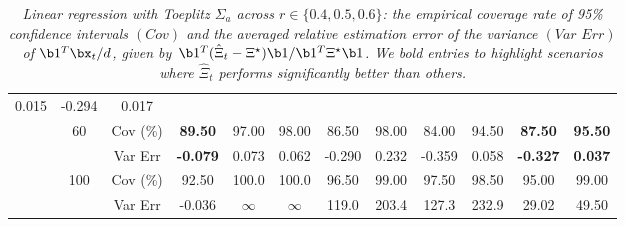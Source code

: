 \begin{table}[!t]
{\begin{tabular}{|c|c|c|c|cccccccc|}
\multicolumn{1}{c|}{0.015} &
-0.294 &
0.017 \\ \cline{2-12} 
&
\multirow{2}{*}{60} &
Cov (\%) &
\textbf{89.50} &
97.00 &
\multicolumn{1}{c|}{98.00} &
86.50 &
\multicolumn{1}{c|}{98.00} &
84.00 &
\multicolumn{1}{c|}{94.50} &
\textbf{87.50} &
\textbf{95.50} \\
&
&
Var Err &
\textbf{-0.079} &
0.073 &
\multicolumn{1}{c|}{0.062} &
-0.290 &
\multicolumn{1}{c|}{0.232} &
-0.359 &
\multicolumn{1}{c|}{0.058} &
\textbf{-0.327} &
\textbf{0.037} \\ \cline{2-12} 
&
\multirow{2}{*}{100} &
Cov (\%) &
92.50 &
100.0 &
\multicolumn{1}{c|}{100.0} &
96.50 &
\multicolumn{1}{c|}{99.00} &
97.50 &
\multicolumn{1}{c|}{98.50} &
95.00 &
99.00 \\
&
&
Var Err &
-0.036 &
$\infty$ &
\multicolumn{1}{c|}{$\infty$} &
119.0 &
\multicolumn{1}{c|}{203.4} &
127.3 &
\multicolumn{1}{c|}{232.9} &
29.02 &
49.50 \\ \hline		
\end{tabular}}
\caption{\textit{Linear regression with Toeplitz $\Sigma_a$ across $r\in\{0.4, 0.5, 0.6\}$: the empirical coverage rate of 95\% confidence intervals $(\textit{Cov})$ and the averaged relative estimation error of the variance $(\textit{Var Err})$ of $\b1^T\bx_t/d$, given by~\mbox{$\b1^T(\hat{\Xi}_t-\Xi^\star)\b1/\b1^T\Xi^\star\b1$}. We bold entries to highlight scenarios where $\hat{\Xi}_t$ performs significantly better than others.}}
\label{appen:table:1}
\end{table}


